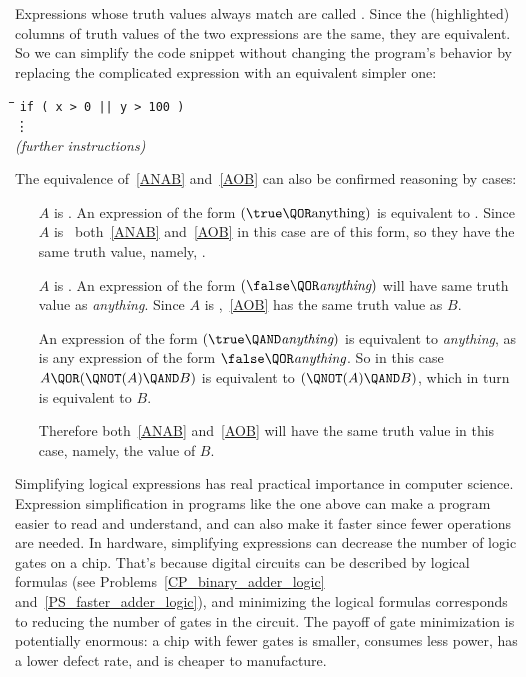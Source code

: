 Expressions whose truth values always match are called .
Since the (highlighted) columns of truth values of the two expressions are
the same, they are equivalent.  So we can simplify the code snippet
without changing the program's behavior by replacing the complicated
expression with an equivalent simpler one:
%
\begin{tabbing}
\hspace{1in} \= \quad\quad \= \quad\quad \= \quad\quad \= \kill
\> \texttt{if ( x > 0 || y > 100 )} \\
\> \> \vdots\\
\> \emph{(further instructions)}
\end{tabbing}

The equivalence of~\eqref{ANAB} and~\eqref{AOB} can also be confirmed
reasoning by cases:
\begin{itemize}
\item[$A$ is \true.]  An expression of the form $(\true \QOR
  \text{anything})$ is equivalent to \true.  Since $A$ is \true\
  both~\eqref{ANAB} and~\eqref{AOB} in this case are of this form, so they
  have the same truth value, namely, \true.

\item[$A$ is \false.]  An expression of the form $(\false \QOR
  \textit{anything})$ will have same truth value as \emph{anything}.
  Since $A$ is \false,~\eqref{AOB} has the same truth value as $B$.

   An expression of the form $(\true \QAND \textit{anything})$ is
   equivalent to \emph{anything}, as is any expression of the form
   $\false \QOR \emph{anything}$.  So in this case $A \QOR (\QNOT(A)
   \QAND B)$ is equivalent to $(\QNOT(A) \QAND B)$, which in turn is
   equivalent to $B$.

   Therefore both~\eqref{ANAB} and~\eqref{AOB} will have the same truth
   value in this case, namely, the value of $B$.
\end{itemize}

Simplifying logical expressions has real practical importance in
computer science.  Expression simplification in programs like the one
above can make a program easier to read and understand, and can also
make it faster since fewer operations are needed.  In hardware,
simplifying expressions can decrease the number of logic gates on a
chip.  That's because digital circuits can be described by logical
formulas (see Problems~\ref{CP_binary_adder_logic}
and~\ref{PS_faster_adder_logic}), and minimizing the logical formulas
corresponds to reducing the number of gates in the circuit.  The
payoff of gate minimization is potentially enormous: a chip with fewer
gates is smaller, consumes less power, has a lower defect rate, and is
cheaper to manufacture.

